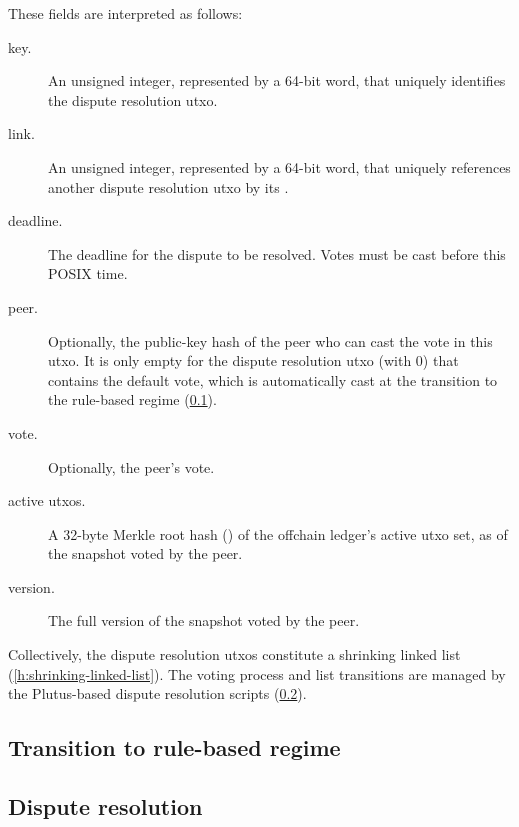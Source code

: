 \documentclass[../hydrozoa.tex]{subfiles}
\begin{document}
These fields are interpreted as follows:
\begin{description}
  \item[key.] An unsigned integer, represented by a 64-bit word, that uniquely identifies the dispute resolution utxo.
  \item[link.] An unsigned integer, represented by a 64-bit word, that uniquely references another dispute resolution utxo by its .
  \item[deadline.] The deadline for the dispute to be resolved. Votes must be cast before this POSIX time.
  \item[peer.] Optionally, the public-key hash of the peer who can cast the vote in this utxo. It is only empty for the dispute resolution utxo (with  0) that contains the default vote, which is automatically cast at the transition to the rule-based regime (\cref{h:rule-based-transition}).
  \item[vote.] Optionally, the peer's vote.
  \item[active utxos.] A 32-byte Merkle root hash () of the offchain ledger's active utxo set, as of the snapshot voted by the peer.
  \item[version.] The full version of the snapshot voted by the peer.
\end{description}

Collectively, the dispute resolution utxos constitute a shrinking linked list (\cref{h:shrinking-linked-list}).
The voting process and list transitions are managed by the Plutus-based dispute resolution scripts (\cref{h:rule-based-dispute-resolution}).

\subsection{Transition to rule-based regime}%
\label{h:rule-based-transition}


\subsection{Dispute resolution}%
\label{h:rule-based-dispute-resolution}



\end{document}
